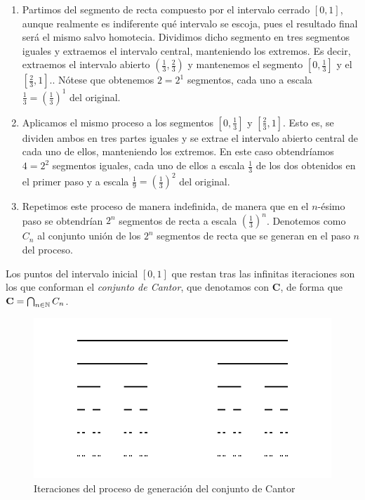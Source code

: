 \begin{enumerate}
\item Partimos del segmento de recta compuesto por el intervalo cerrado $[0,1]$, aunque realmente es indiferente qué intervalo se escoja, pues el resultado final será el mismo salvo homotecia. Dividimos dicho segmento en tres segmentos iguales y extraemos el intervalo central, manteniendo los extremos. Es decir, extraemos el intervalo abierto $\left(\frac 1 3, \frac 2 3\right)$ y mantenemos el segmento $\left[0,\frac 1 3\right]$ y el $\left[\frac 2 3, 1\right]$.. Nótese que obtenemos $2=2^1$ segmentos, cada uno a escala $\frac 1 3=\left(\frac 1 3\right)^1$ del original.

\item Aplicamos el mismo proceso a los segmentos $\left[0,\frac 1 3\right]$ y $\left[\frac 2 3, 1\right]$. Esto es, se dividen ambos en tres partes iguales y se extrae el intervalo abierto central de cada uno de ellos, manteniendo los extremos. En este caso obtendríamos $4=2^2$ segmentos iguales, cada uno de ellos a escala $\frac 1 3$ de los dos obtenidos en el primer paso y a escala $\frac 1 9=\left(\frac 1 3\right)^2$ del original.

\item Repetimos este proceso de manera indefinida, de manera que en el $n$-ésimo paso se obtendrían $2^n$ segmentos de recta a escala $\left(\frac 1 3\right)^n$. Denotemos como $C_n$ al conjunto unión de los $2^n$ segmentos de recta que se generan en el paso $n$ del proceso.
\end{enumerate} 

Los puntos del intervalo inicial $[0,1]$ que restan tras las infinitas iteraciones son los que conforman el \textit{conjunto de Cantor}, que denotamos con $\mathbf{C}$, de forma que $\mathbf{C}=\bigcap_{n\in\mathbb{N}}C_n$.

\begin{figure} [ht]
\centering
\includegraphics[scale = 0.4]{img/cantor.png}
\caption{Iteraciones del proceso de generación del conjunto de Cantor}
 \label{fig:Cantor}
\end{figure}

